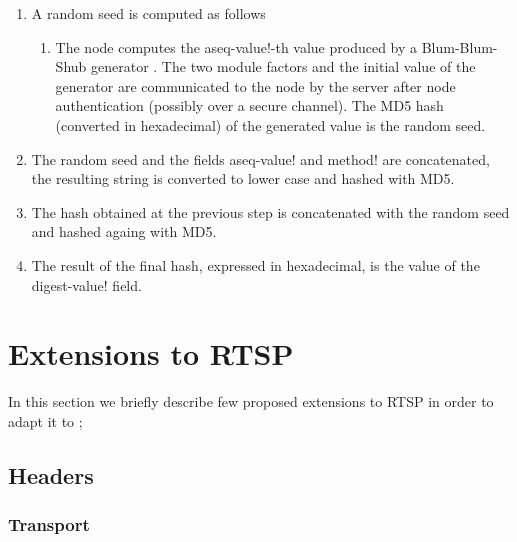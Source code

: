 \documentclass{rfc}
\begin{document}
\begin{enumerate}
\item
A random seed is computed as follows
   \begin{enumerate}
   \item
     The node computes the \ttt aseq-value!-th value produced by a
     Blum-Blum-Shub generator \cite{blum-blum-shub}.  The two module
     factors and the initial value of the generator are communicated
     to the node by the server after node authentication (possibly
     over a secure channel).  The MD5 hash (converted in hexadecimal)
     of the generated value is the random seed.
   \end{enumerate}
\item
The random seed and the fields \ttt aseq-value! and \ttt method! are
concatenated, the resulting string is converted to lower case and
hashed with MD5. 
\item
The hash obtained at the previous step is concatenated with the random
seed and hashed againg with MD5.  
\item
The result of the final hash,
expressed in hexadecimal, is the value of the \ttt digest-value! field.
\end{enumerate}
%


\chapter{Extensions to RTSP}
\label{sect:8;transport_layer}

In this section we briefly describe few proposed extensions to RTSP in
order to adapt it to \ppmtp;

\section{Headers}

\subsection{Transport}
\label{subsub:0;transport_layer}
\end{document}
